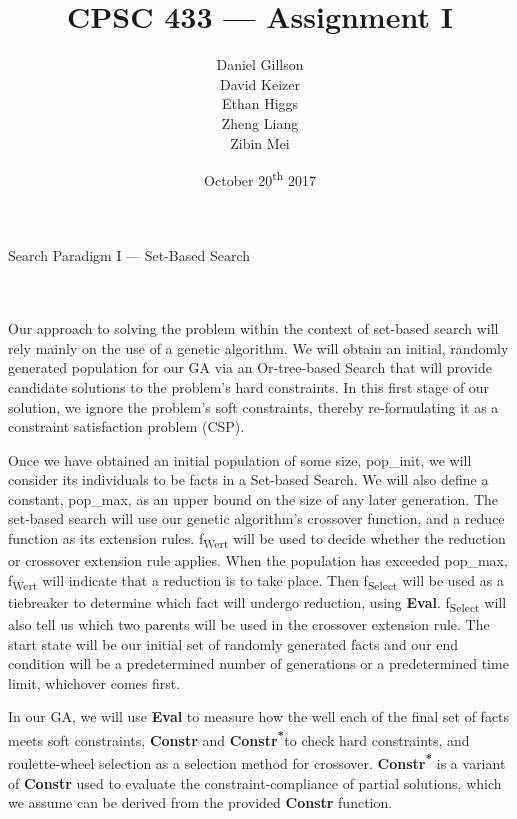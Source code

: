 \documentclass[11pt, oneside]{article}   	%
\title{\vspace{40mm}CPSC 433 --- Assignment I}
\author{
	Daniel Gillson\\
	David Keizer\\
	Ethan Higgs\\
	Zheng Liang\\
	Zibin Mei}
\date{October 20\textsuperscript{th} 2017}
\newenvironment{cmr}{\fontfamily{cmr}\selectfont}{\par}
\begin{document}
\maketitle
\break

\centerline{{\Large Search Paradigm I --- Set-Based Search}}

\\\\
\begin{cmr}
\indent Our approach to solving the problem within the context of set-based search will rely mainly on the use of a genetic algorithm.
We will obtain an initial, randomly generated population for our GA via an Or-tree-based Search that will provide candidate solutions to the problem's
hard constraints. In this first stage of our solution, we ignore the problem's soft constraints, thereby re-formulating it as a constraint satisfaction problem (CSP).

\indent Once we have obtained an initial population of some size, pop_init, we will consider its individuals to be facts in a Set-based Search.
We will also define a constant, pop_max, as an upper bound on the size of any later generation.
The set-based search will use our genetic algorithm's crossover function, and a reduce function as its extension rules.
f\textsubscript{Wert} will be used to decide whether the reduction or crossover extension rule applies.
When the population has exceeded pop_max, f\textsubscript{Wert} will indicate that a reduction is to take place. 
Then  f\textsubscript{Select} will be used as a tiebreaker to determine which fact will undergo reduction, using \textbf{Eval}.
f\textsubscript{Select} will also tell us which two parents will be used in the crossover extension rule.
The start state will be our initial set of randomly generated facts and our end condition will be a predetermined number of generations or a predetermined time limit, whichover comes first.

\indent In our GA, we will use \textbf{Eval} to measure how the well each of the final set of facts meets soft constraints, \textbf{Constr} and \textbf{Constr\textsuperscript{*}}to check hard constraints, and roulette-wheel selection as a selection method for crossover.
\textbf{Constr\textsuperscript{*}} is a variant of \textbf{Constr} used to evaluate the constraint-compliance of partial solutions, which we assume can be derived from the provided \textbf{Constr} function.
\end{cmr}
\end{document}
